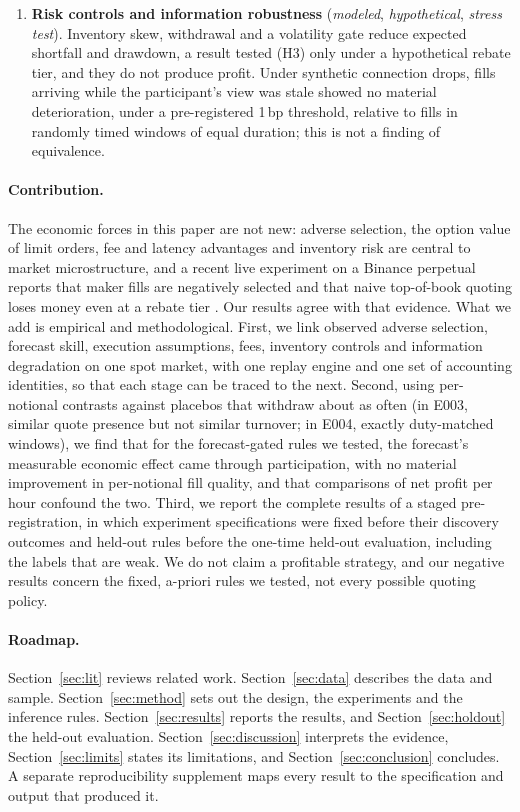 \documentclass[11pt]{article}
\newcommand{\status}[1]{\textit{#1}}
\newcommand{\mhr}{\status{modeled}}
\newcommand{\stress}{\status{stress test}}
\newcommand{\hyp}{\status{hypothetical}}
\newcommand{\bp}{\,bp}
\begin{document}
\begin{enumerate}
  the attainable fee (a discovery decision; on the holdout the policy results are descriptive, with no confirmation
  claim).
  \item \textbf{Risk controls and information robustness} (\mhr{}, \hyp{}, \stress{}). Inventory skew, withdrawal and a
  volatility gate reduce expected shortfall and drawdown, a result tested (H3) only under a hypothetical rebate tier, and
  they do not produce profit. Under synthetic connection drops, fills arriving while the participant's view was stale showed no material
  deterioration, under a pre-registered 1\bp{} threshold, relative to fills in randomly timed windows of equal duration;
  this is not a finding of equivalence.
\end{enumerate}

\paragraph{Contribution.} The economic forces in this paper are not new: adverse selection, the option value of limit
orders, fee and latency advantages and inventory risk are central to market microstructure, and a recent live
experiment on a Binance perpetual reports that maker fills are negatively selected and that naive top-of-book quoting
loses money even at a rebate tier \citep{albers2025dilemma}. Our results agree with that evidence. What we add is
empirical and methodological. First, we link observed adverse selection, forecast skill, execution assumptions, fees,
inventory controls and information degradation on one spot market, with one replay engine and one set of accounting
identities, so that each stage can be traced to the next. Second, using per-notional contrasts against placebos that withdraw
about as often (in E003, similar quote presence but not similar turnover; in E004, exactly duty-matched windows), we find
that for the forecast-gated rules we tested, the forecast's measurable economic effect came through participation, with
no material improvement in per-notional fill quality, and that comparisons of net profit per hour confound the two.
Third, we report the complete results of a staged pre-registration, in which experiment specifications were fixed before
their discovery outcomes and held-out rules before the one-time held-out evaluation, including the labels that are weak. We do not claim a profitable strategy, and our
negative results concern the fixed, a-priori rules we tested, not every possible quoting policy.

\paragraph{Roadmap.} Section~\ref{sec:lit} reviews related work. Section~\ref{sec:data} describes the data and
sample. Section~\ref{sec:method} sets out the design, the experiments and the inference rules. Section~\ref{sec:results}
reports the results, and Section~\ref{sec:holdout} the held-out evaluation. Section~\ref{sec:discussion} interprets the
evidence, Section~\ref{sec:limits} states its limitations, and Section~\ref{sec:conclusion} concludes. A separate
reproducibility supplement maps every result to the specification and output that produced it.
\end{document}
